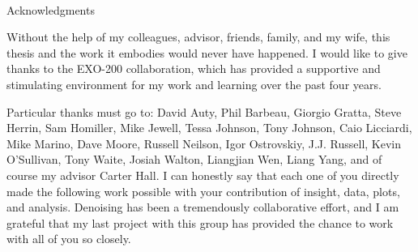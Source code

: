 
\renewcommand{\baselinestretch}{2}
\small\normalsize
\hbox{\ }
 
\vspace{-.65in}

\begin{center}
\large{Acknowledgments} 
\end{center} 

\vspace{1ex}

Without the help of my colleagues, advisor, friends, family, and my wife, this thesis and the work it embodies would never have happened.  I would like to give thanks to the EXO-200 collaboration, which has provided a supportive and stimulating environment for my work and learning over the past four years.

Particular thanks must go to: David Auty, Phil Barbeau, Giorgio Gratta, Steve Herrin, Sam Homiller, Mike Jewell, Tessa Johnson, Tony Johnson, Caio Licciardi, Mike Marino, Dave Moore, Russell Neilson, Igor Ostrovskiy, J.J. Russell, Kevin O'Sullivan, Tony Waite, Josiah Walton, Liangjian Wen, Liang Yang, and of course my advisor Carter Hall.  I can honestly say that each one of you directly made the following work possible with your contribution of insight, data, plots, and analysis.  Denoising has been a tremendously collaborative effort, and I am grateful that my last project with this group has provided the chance to work with all of you so closely.
